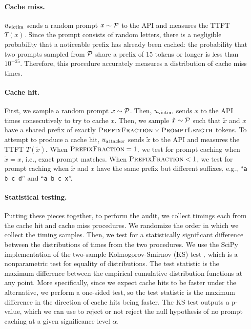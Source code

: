 \paragraph{Cache miss.}
$u_\text{victim}$ sends a random prompt $x \sim \mathcal{P}$ to the API and measures the TTFT $T(x)$. Since the prompt consists of random letters, there is a negligible probability that a noticeable prefix has already been cached: the probability that two prompts sampled from $\mathcal{P}$ share a prefix of 15 tokens or longer is less than $10^{-25}$. Therefore, this procedure accurately measures a distribution of cache miss times.


\paragraph{Cache hit.}
First, we sample a random prompt $x \sim \mathcal{P}$. Then, $u_\text{victim}$ sends $x$ to the API \NumVictimRequests{} times consecutively to try to cache $x$. Then, we sample $\tilde{x} \sim \mathcal{P}$ such that $\tilde{x}$ and $x$ have a shared prefix of exactly $\textsc{PrefixFraction} \times \textsc{PromptLength}$ tokens. To attempt to produce a cache hit, $u_\text{attacker}$ sends $\tilde{x}$ to the API and measures the TTFT $T(\tilde{x})$. When $\textsc{PrefixFraction} = 1$, we test for prompt caching when $\tilde{x} = x$, i.e., exact prompt matches. When $\textsc{PrefixFraction} < 1$, we test for prompt caching when $\tilde{x}$ and $x$ have the same prefix but different suffixes, e.g., ``\texttt{a b c d}'' and ``\texttt{a b c x}''.





\paragraph{Statistical testing.}
Putting these pieces together, to perform the audit, we collect \NumSamples{} timings each from the cache hit and cache miss procedures. We randomize the order in which we collect the timing samples. Then, we test for a statistically significant difference between the distributions of times from the two procedures. We use the SciPy implementation \citep{2020SciPy-NMeth} of the two-sample Kolmogorov-Smirnov (KS) test \citep{hodges1958significance}, which is a nonparametric test for equality of distributions. The test statistic is the maximum difference between the empirical cumulative distribution functions at any point. More specifically, since we expect cache hits to be faster under the alternative, we perform a one-sided test, so the test statistic is the maximum difference in the direction of cache hits being faster. The KS test outputs a p-value, which we can use to reject or not reject the null hypothesis of no prompt caching at a given significance level $\alpha$.
